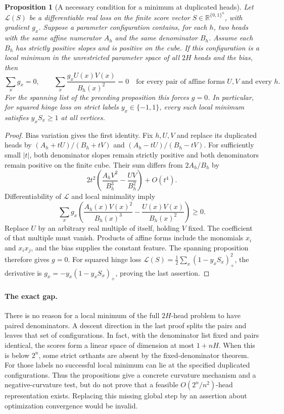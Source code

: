 \documentclass[11pt]{article}
\newtheorem{proposition}{Proposition}
\newcommand{\Qn}{\{0,1\}^n}
\begin{document}
\begin{proposition}[A necessary condition for a minimum at duplicated heads]
Let $\mathcal L(S)$ be a differentiable real loss on the finite score
vector $S\in\mathbb R^{\Qn}$, with gradient $g_x$.
Suppose a parameter configuration contains, for each $h$, two heads
with the same affine numerator $A_h$ and the same denominator $B_h$.
Assume each $B_h$ has strictly positive slopes and is positive on the
cube. If this configuration is a local minimum in the unrestricted
parameter space of all $2H$ heads and the bias, then
\[
 \sum_x g_x=0,\qquad
 \sum_x\frac{g_x U(x)V(x)}{B_h(x)^2}=0
 \quad\text{for every pair of affine forms }U,V\text{ and every }h.
\]
For the spanning list of the preceding proposition this forces $g=0$.
In particular, for squared hinge loss on strict labels $y_x\in\{-1,1\}$,
every such local minimum satisfies $y_xS_x\ge1$ at all vertices.
\end{proposition}
\begin{proof}
Bias variation gives the first identity. Fix $h,U,V$ and replace its
duplicated heads by $(A_h+tU)/(B_h+tV)$ and
$(A_h-tU)/(B_h-tV)$. For sufficiently small $|t|$, both denominator
slopes remain strictly positive and both denominators remain positive
on the finite cube. Their sum differs from $2A_h/B_h$ by
\[
 2t^2\left(\frac{A_h V^2}{B_h^3}-\frac{UV}{B_h^2}\right)+O(t^4).
\]
Differentiability of $\mathcal L$ and local minimality imply
\[
 \sum_x g_x\left(\frac{A_h(x)V(x)^2}{B_h(x)^3}
                    -\frac{U(x)V(x)}{B_h(x)^2}\right)\ge0.
\]
Replace $U$ by an arbitrary real multiple of itself, holding $V$ fixed.
The coefficient of that multiple must vanish. Products of affine forms
include the monomials $x_i$ and $x_ix_j$, and the bias supplies the
constant feature. The spanning proposition therefore gives $g=0$.
For squared hinge loss $\mathcal L(S)=\frac12\sum_x(1-y_xS_x)_+^2$,
the derivative is $g_x=-y_x(1-y_xS_x)_+$, proving the last assertion.
\end{proof}

\paragraph{The exact gap.}
There is no reason for a local minimum of the full $2H$-head problem
to have paired denominators. A descent direction in the last proof
splits the pairs and leaves that set of configurations. In fact, with
the denominator list fixed and pairs identical, the scores form a
linear space of dimension at most $1+nH$. When this is below $2^n$,
some strict orthants are absent by the fixed-denominator theorem.
For those labels no successful local minimum can lie at the specified
duplicated configurations. Thus the propositions give a concrete
curvature mechanism and a negative-curvature test, but do not prove
that a feasible $O(2^n/n^2)$-head representation exists. Replacing this
missing global step by an assertion about optimization convergence
would be invalid.
\end{document}
